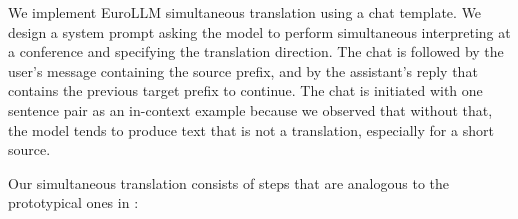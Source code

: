 \documentclass[11pt]{article}
\def\XXX#1{} %
\begin{document}
                
We implement EuroLLM simultaneous translation using a chat template. We design a system prompt asking the model to perform simultaneous interpreting at a conference and specifying the translation direction. The chat is followed by the user's message containing the source prefix, and by the assistant's reply that contains the previous target prefix to continue. The chat is initiated with one sentence pair as an in-context example because we observed that without that, the model tends to produce text that is not a translation, especially for a short source.


Our simultaneous translation consists of steps that are analogous to the prototypical ones in \citet{papi-etal-2024-how-real}:


\def\BufferTrimmingStrategy{\textit{BufferTrimmingStrategy}}
\def\BufferTrimmingStrategies{\textit{BufferTrimmingStrategies}}
\def\Sentences{\textit{Sentences}}
\def\Segments{\textit{Segments}}
\end{document}
